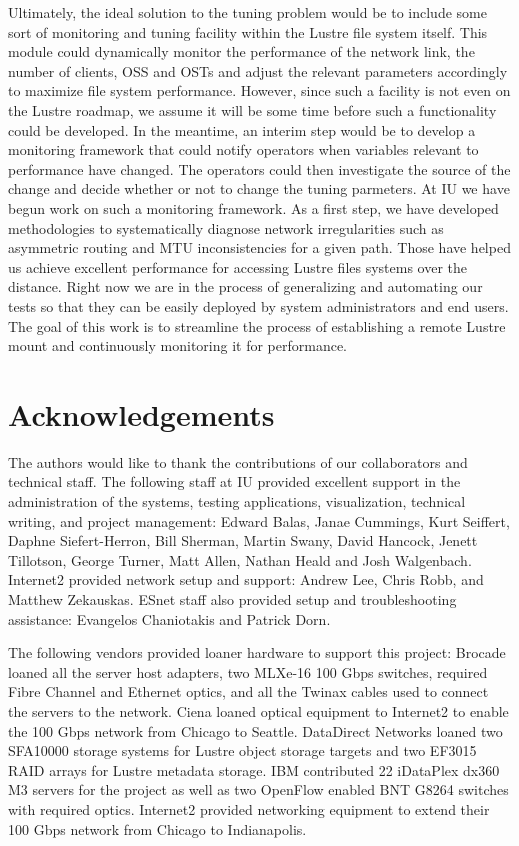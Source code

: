 \documentclass[]{sigplan-proc}
\begin{document}
Ultimately, the ideal solution to the tuning problem would be to include some sort of monitoring and tuning
facility within the Lustre file system itself. This module could dynamically monitor the performance of the
network link, the number of clients, OSS and OSTs and adjust the relevant parameters accordingly to maximize
file system performance. However, since such a facility is not even on the Lustre roadmap, we assume it will
be some time before such a functionality could be developed. In the meantime, an interim step would be to
develop a monitoring framework that could notify operators when variables relevant to performance have
changed. The operators could then investigate the source of the change and decide whether or not to change the
tuning parmeters. At IU we have begun work on such a monitoring framework. As a first step, we have developed
methodologies to systematically diagnose network irregularities such as asymmetric routing and MTU
inconsistencies for a given path. Those have helped us achieve excellent performance for accessing Lustre
files systems over the distance. Right now we are in the process of generalizing and automating our tests so
that they can be easily deployed by system administrators and end users. The goal of this work is to
streamline the process of establishing a remote Lustre mount and continuously monitoring it for performance.
  
\section{Acknowledgements}

The authors would like to thank the contributions of our collaborators and technical staff. The following
staff at IU provided excellent support in the administration of the systems, testing applications,
visualization, technical writing, and project management: Edward Balas, Janae Cummings, Kurt Seiffert, Daphne
Siefert-Herron, Bill Sherman, Martin Swany, David Hancock, Jenett Tillotson, George Turner, Matt Allen, Nathan Heald and Josh Walgenbach. Internet2 provided network setup and support: Andrew Lee, Chris Robb, and Matthew Zekauskas. ESnet staff also provided setup and troubleshooting assistance: Evangelos Chaniotakis and Patrick Dorn.

The following vendors provided loaner hardware to support this project: Brocade loaned all the server host
adapters, two MLXe-16 100 Gbps switches, required Fibre Channel and Ethernet optics, and all the Twinax cables
used to connect the servers to the network. Ciena loaned optical equipment to Internet2 to enable the 100 Gbps
network from Chicago to Seattle. DataDirect Networks loaned two SFA10000 storage systems for Lustre object
storage targets and two EF3015 RAID arrays for Lustre metadata storage. IBM contributed 22 iDataPlex dx360 M3
servers for the project as well as two OpenFlow enabled BNT G8264 switches with required optics. Internet2
provided networking equipment to extend their 100 Gbps network from Chicago to Indianapolis.



\end{document}
